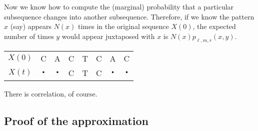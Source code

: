 \documentclass{article}
\theoremstyle{plain}
\theoremstyle{definition}
\begin{document}
Now we know how to compute the (marginal) probability that a particular subsequence changes into another subsequence.
Therefore, if we know the pattern $x$ (say) appears $N(x)$ times in the original sequence $X(0)$,
the expected number of times $y$ would appear juxtaposed with $x$ is $N(x)p_{\ell,m,r}(x,y)$.

\begin{flushright}
\begin{tabular}{c|ccccccc}
 $X(0)$ &  C  & A & C & T & C & A & C \\
 $X(t)$ &  $\centerdot$  & $\centerdot$  & C & T & C & $\centerdot$  & $\centerdot$  
\end{tabular}
\end{flushright}


There is correlation, of course.



\subsection*{Proof of the approximation}
\end{document}
